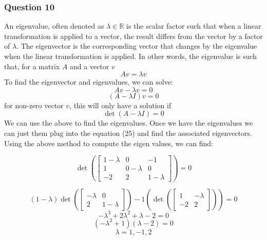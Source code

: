 \documentclass{article}
\begin{document}
\subsubsection*{Question 10}
An eigenvalue, often denoted as $\lambda \in \mathbb{R} $ is the scalar factor such that
when a linear transformation is applied to a vector, the result differs from the vector
by a factor of $\lambda$. The eigenvector is the corresponding vector that changes by 
the eigenvalue when the linear transformation is applied. In other words, the eigenvalue is
such that, for a matrix $A$ and a vector $v$
\begin{equation}
  Av = \lambda v
\end{equation}
To find the eigenvector and eigenvalues, we can solve:
\[
  Av - \lambda v = 0
\]
\begin{equation}
  (A-\lambda I)v = 0
\end{equation}
for non-zero vector $v$, this will only have a solution if
\[ \det (A-\lambda I) = 0\]
We can use the above to find the eigenvalues. Once we have the eigenvalues we can just them plug into 
the equation (25) and find the associated eigenvectors.
\newline
Using the above method to compute the eigen values, we can find:

\begin{equation}
  \det\left( \begin{bmatrix}
    1-\lambda & 0 & -1 \\
    1 & 0-\lambda & 0 \\
    -2 & 2 & 1-\lambda
  \end{bmatrix}\right) = 0
\end{equation}

\begin{equation}
  (1-\lambda)\det\left( 
  \begin{bmatrix}
    -\lambda & 0 \\ 2 & 1-\lambda
  \end{bmatrix}\right) - 
  1(\det\left( 
  \begin{bmatrix}
    1 & -\lambda \\ -2 & 2
  \end{bmatrix}\right)) = 0
\end{equation}
\begin{equation}
  -\lambda^3 + 2\lambda^2 + \lambda - 2 = 0
\end{equation}
\begin{equation}
  (-\lambda^2 + 1)(\lambda - 2) = 0
\end{equation}
\begin{equation}
  \lambda = 1, -1, 2
\end{equation}
\end{document}
